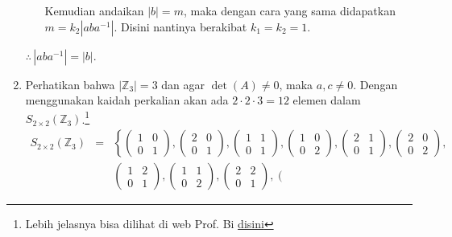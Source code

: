 \documentclass[10pt,openany,a4paper]{article}
\newcommand{\Z}{\mathbb{Z}}
\begin{document}
\begin{enumerate}
\begin{itemize}
        Kemudian andaikan $|b|=m$, maka dengan cara yang sama didapatkan $m=k_2|aba^{-1}|$. Disini nantinya berakibat $k_1=k_2=1$.
    \end{itemize}
    $\therefore \,|aba^{-1}|=|b|$.

    \item Perhatikan bahwa $|\Z_3|=3$ dan agar $\det(A)\ne 0$, maka $a,c\ne 0$. Dengan menggunakan kaidah perkalian akan ada $2\cdot 2\cdot 3=12$ elemen dalam $S_{2\times 2}(\Z_3)$.\footnote{Lebih jelasnya bisa dilihat di web Prof. Bi \href{https://sites.google.com/view/aljabar-i/grup/pembahasan-soal-soal?authuser=0}{disini}}
    \begin{eqnarray*}
        S_{2\times 2}(\mathbb{Z}_3)&=&\left\{\left(\begin{array}{rr}
        1 & 0 \\
        0 & 1
        \end{array}\right), \left(\begin{array}{rr}
        2 & 0 \\
        0 & 1
        \end{array}\right), \left(\begin{array}{rr}
        1 & 1 \\
        0 & 1
        \end{array}\right), \left(\begin{array}{rr}
        1 & 0 \\
        0 & 2
        \end{array}\right), \left(\begin{array}{rr}
        2 & 1 \\
        0 & 1
        \end{array}\right), \left(\begin{array}{rr}
        2 & 0 \\
        0 & 2
        \end{array}\right)\right.,\\
        && \left. \left(\begin{array}{rr}
        1 & 2 \\
        0 & 1
        \end{array}\right), \left(\begin{array}{rr}
        1 & 1 \\
        0 & 2
        \end{array}\right), \left(\begin{array}{rr}
        2 & 2 \\
        0 & 1
        \end{array}\right), \left(\begin{array}{rr}

\end{array}
\end{eqnarray*}
\end{enumerate}
\end{document}
